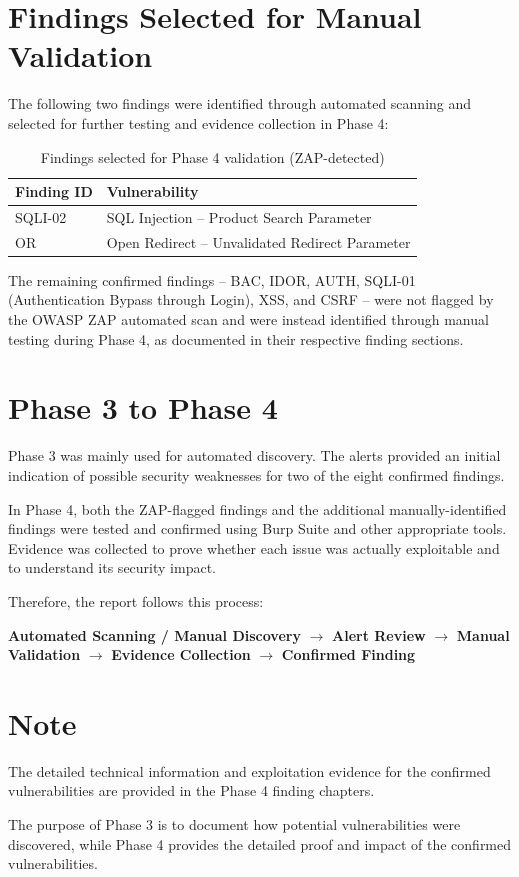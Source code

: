 \section{Findings Selected for Manual Validation}

The following two findings were identified through automated
scanning and selected for further testing and evidence collection in
Phase 4:

\begin{table}[H]
\centering
\begin{tabular}{|l|p{8cm}|}
\hline
\textbf{Finding ID} & \textbf{Vulnerability} \\
\hline
SQLI-02 & SQL Injection -- Product Search Parameter \\
\hline
OR & Open Redirect -- Unvalidated Redirect Parameter \\
\hline
\end{tabular}
\caption{Findings selected for Phase 4 validation (ZAP-detected)}
\end{table}

The remaining confirmed findings -- BAC, IDOR, AUTH,
SQLI-01 (Authentication Bypass through Login), XSS, and CSRF --
were not flagged by the OWASP ZAP automated scan and were instead
identified through manual testing during Phase 4, as documented in
their respective finding sections.

\section{Phase 3 to Phase 4}

Phase 3 was mainly used for automated discovery. The alerts provided
an initial indication of possible security weaknesses for two of the
eight confirmed findings.

In Phase 4, both the ZAP-flagged findings and the additional
manually-identified findings were tested and confirmed using Burp
Suite and other appropriate tools. Evidence was collected to prove
whether each issue was actually exploitable and to understand its
security impact.

Therefore, the report follows this process:

\begin{center}
\textbf{Automated Scanning / Manual Discovery}
$\rightarrow$
\textbf{Alert Review}
$\rightarrow$
\textbf{Manual Validation}
$\rightarrow$
\textbf{Evidence Collection}
$\rightarrow$
\textbf{Confirmed Finding}
\end{center}

\section{Note}

The detailed technical information and exploitation evidence for the
confirmed vulnerabilities are provided in the Phase 4 finding
chapters.

The purpose of Phase 3 is to document how potential vulnerabilities
were discovered, while Phase 4 provides the detailed proof and impact
of the confirmed vulnerabilities.